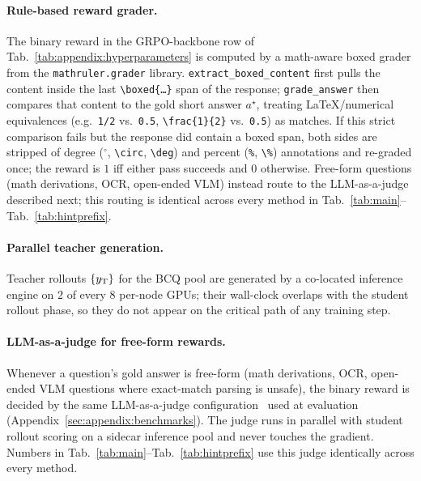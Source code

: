 \documentclass{llmxive}
\begin{document}
\paragraph{Rule-based reward grader.}
The binary reward in the GRPO-backbone row of Tab.~\ref{tab:appendix:hyperparameters} is computed by a math-aware boxed grader from the \texttt{mathruler.grader} library. \texttt{extract\_boxed\_content} first pulls the content inside the last \texttt{\textbackslash boxed\{\dots\}} span of the response; \texttt{grade\_answer} then compares that content to the gold short answer $a^{\star}$, treating LaTeX/numerical equivalences (e.g.\ \texttt{1/2} vs.\ \texttt{0.5}, \texttt{\textbackslash frac\{1\}\{2\}} vs.\ \texttt{0.5}) as matches. If this strict comparison fails but the response did contain a boxed span, both sides are stripped of degree (${}^{\circ}$, \texttt{\textbackslash circ}, \texttt{\textbackslash deg}) and percent (\texttt{\%}, \texttt{\textbackslash \%}) annotations and re-graded once; the reward is $1$ iff either pass succeeds and $0$ otherwise. Free-form questions (math derivations, OCR, open-ended VLM) instead route to the LLM-as-a-judge described next; this routing is identical across every method in Tab.~\ref{tab:main}--Tab.~\ref{tab:hintprefix}.

\paragraph{Parallel teacher generation.}
Teacher rollouts $\{y_{\rm T}\}$ for the BCQ pool are generated by a co-located inference engine on $2$ of every $8$ per-node GPUs; their wall-clock overlaps with the student rollout phase, so they do not appear on the critical path of any training step.

\paragraph{LLM-as-a-judge for free-form rewards.}
Whenever a question's gold answer is free-form (math derivations, OCR, open-ended VLM questions where exact-match parsing is unsafe), the binary reward is decided by the same LLM-as-a-judge configuration~\citep{zheng2023judging} used at evaluation (Appendix~\ref{sec:appendix:benchmarks}). The judge runs in parallel with student rollout scoring on a sidecar inference pool and never touches the gradient. Numbers in Tab.~\ref{tab:main}--Tab.~\ref{tab:hintprefix} use this judge identically across every method.
\end{document}
